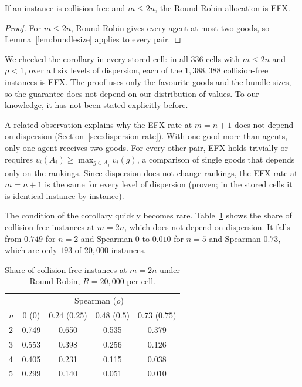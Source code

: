 \begin{corollary}\label{cor:bundlesize}
If an instance is collision-free and $m\leq2n$, the Round Robin allocation is EFX.
\end{corollary}

\begin{proof}
For $m\leq2n$, Round Robin gives every agent at most two goods, so Lemma~\ref{lem:bundlesize}
applies to every pair.
\end{proof}

We checked the corollary in every stored cell: in all $336$ cells with $m\leq2n$ and $\rho<1$,
over all six levels of dispersion, each of the $1{,}388{,}388$ collision-free instances is EFX.
The proof uses only the favourite goods and the bundle sizes, so the guarantee does not depend on
our distribution of values. To our knowledge, it has not been stated explicitly before.

A related observation explains why the EFX rate at $m=n+1$ does not depend on dispersion
(Section~\ref{sec:dispersion-rate}). With one good more than agents, only one agent receives two
goods. For every other pair, EFX holds trivially or requires $v_i(A_i)\geq\max_{g\in A_j}v_i(g)$,
a comparison of single goods that depends only on the rankings. Since dispersion does not change
rankings, the EFX rate at $m=n+1$ is the same for every level of dispersion (proven; in the
stored cells it is identical instance by instance).

The condition of the corollary quickly becomes rare. Table~\ref{tab:collisionfree} shows the
share of collision-free instances at $m=2n$, which does not depend on dispersion. It falls from
$0.749$ for $n=2$ and Spearman $0$ to $0.010$ for $n=5$ and Spearman $0.73$, which are only $193$
of $20{,}000$ instances.

\begin{table}[H]
  \centering
  \caption{Share of collision-free instances at $m=2n$ under Round Robin, $R=20{,}000$ per cell.}
  \label{tab:collisionfree}
  \begin{tabular}{lcccc}
    \toprule
    & \multicolumn{4}{c}{Spearman ($\rho$)} \\
    $n$ & $0$ ($0$) & $0.24$ ($0.25$) & $0.48$ ($0.5$) & $0.73$ ($0.75$) \\
    \midrule
    2 & 0.749 & 0.650 & 0.535 & 0.379 \\
    3 & 0.553 & 0.398 & 0.256 & 0.126 \\
    4 & 0.405 & 0.231 & 0.115 & 0.038 \\
    5 & 0.299 & 0.140 & 0.051 & 0.010 \\
    \bottomrule
  \end{tabular}
\end{table}

